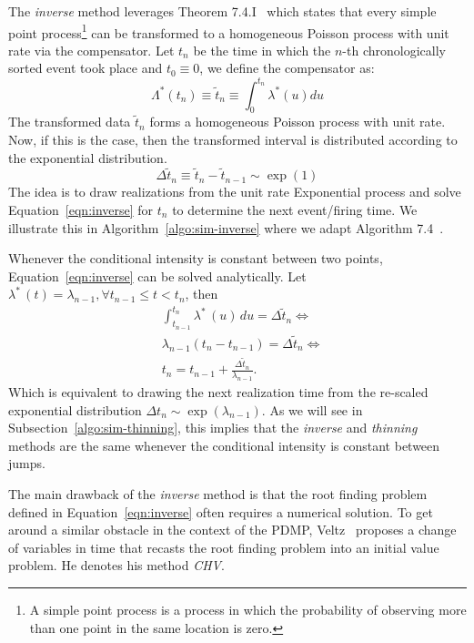 \documentclass{juliacon}
\numberwithin{equation}{section}
\begin{document}
The \textit{inverse} method leverages Theorem 7.4.I~\cite{daley2003} which states that every simple point process\footnote{A simple point process is a process in which the probability of observing more than one point in the same location is zero.} can be transformed to a homogeneous Poisson process with unit rate via the compensator. Let \( t_n \) be the time in which the \( n \)-th chronologically sorted event took place and \( t_0 \equiv 0 \), we define the compensator as:
\begin{equation} \label{eqn:compensator}
  \Lambda^\ast (t_n) \equiv \tilde{t}_n \equiv \int_0^{t_n} \lambda^\ast (u) du
\end{equation}
The transformed data \( \tilde{t}_n \) forms a homogeneous Poisson process with unit rate. Now, if this is the case, then the transformed interval is distributed according to the exponential distribution.
\begin{equation}\label{eqn:inverse}
  \Delta \tilde{t}_n \equiv \tilde{t}_n - \tilde{t}_{n-1} \sim \exp(1)
\end{equation}
The idea is to draw realizations from the unit rate Exponential process and solve Equation~\ref{eqn:inverse} for \( t_n \)  to determine the next event/firing time. We illustrate this in Algorithm~\ref{algo:sim-inverse} where we adapt Algorithm 7.4~\cite{daley2003}.

Whenever the conditional intensity is constant between two points, Equation~\ref{eqn:inverse} can be solved analytically. Let \( \lambda^\ast \, (t) = \lambda_{n-1} , \forall t_{n-1} \leq t < t_n \), then
\begin{equation}
\begin{split}
  &\int_{t_{n-1}}^{t_n} \lambda^\ast \, (u) \, du = \Delta \tilde{t}_{n} \iff \\
  &\lambda_{n-1} (t_n - t_{n-1}) = \Delta \tilde{t}_n \iff \\
  &t_n = t_{n-1} + \frac{\Delta \tilde{t}_n}{\lambda_{n-1}}.
\end{split}
\end{equation}
Which is equivalent to drawing the next realization time from the re-scaled exponential distribution \( \Delta t_n \sim \exp(\lambda_{n-1}) \). As we will see in Subsection~\ref{algo:sim-thinning}, this implies that the \textit{inverse} and \textit{thinning} methods are the same whenever the conditional intensity is constant between jumps.

The main drawback of the \textit{inverse} method is that the root finding problem defined in Equation~\ref{eqn:inverse} often requires a numerical solution. To get around a similar obstacle in the context of the PDMP, Veltz~\cite{veltz2015} proposes a change of variables in time that recasts the root finding problem into an initial value problem. He denotes his method \textit{CHV}.
\end{document}
